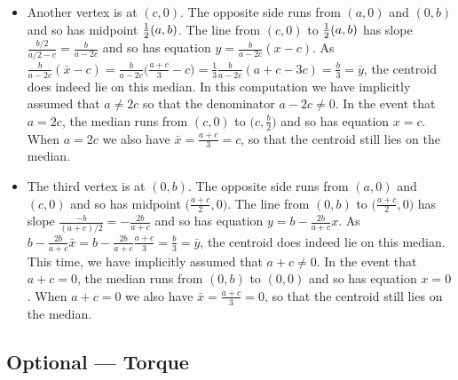 \begin{eg}
\begin{itemize}
\item Another vertex is at $(c,0)$. The opposite side runs from
$(a,0)$ and $(0,b)$ and so has midpoint $\tfrac{1}{2}(a,b)$. The line
from $(c,0)$ to $\tfrac{1}{2}(a,b)$ has slope $\frac{b/2}{a/2-c}=\frac{b}{a-2c}$
and so has equation $y=\frac{b}{a-2c}(x-c)$. As
$\frac{b}{a-2c}(\bar x-c)
=\frac{b}{a-2c}\big(\frac{a+c}{3}-c\big)
=\frac{1}{3}\frac{b}{a-2c}(a+c-3c)
=\frac{b}{3}
=\bar y$, the centroid does indeed lie on this median.
In this computation we have implicitly assumed that $a\ne 2c$ so that
the denominator $a-2c\ne 0$. In the event that $a=2c$, the median runs from
$(c,0)$ to $\big(c,\frac{b}{2}\big)$ and so has equation $x=c$. When
$a=2c$ we also have $\bar x=\frac{a+c}{3}=c$, so that the centroid still
lies on the median.


\item The third vertex is at $(0,b)$. The opposite side runs from
$(a,0)$ and $(c,0)$ and so has midpoint $\big(\frac{a+c}{2},0\big)$.
The line from $(0,b)$ to $\big(\frac{a+c}{2},0\big)$ has slope
$\frac{-b}{(a+c)/2}=-\frac{2b}{a+c}$
and so has equation $y=b-\frac{2b}{a+c}x$. As
$b-\frac{2b}{a+c}\bar x
=b-\frac{2b}{a+c}\frac{a+c}{3}
=\frac{b}{3}
=\bar y$, the centroid does indeed lie on this median.
This time, we have implicitly assumed that $a+c\ne 0$.
In the event that $a+c=0$, the median runs from
$(0,b)$ to $(0,0)$ and so has equation $x=0$. When
$a+c=0$ we also have $\bar x=\frac{a+c}{3}=0$, so that the centroid still
lies on the median.
\end{itemize}


\end{eg}


\goodbreak
\subsection{Optional --- Torque}

